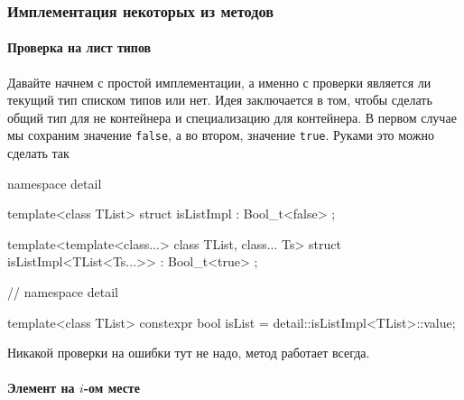 \subsubsection{Имплементация некоторых из методов}

\paragraph{Проверка на лист типов}

Давайте начнем с простой имплементации, а именно с проверки является ли текущий тип списком типов или нет.
Идея заключается в том, чтобы сделать общий тип для не контейнера и специализацию для контейнера.
В первом случае мы сохраним значение \verb"false", а во втором, значение \verb"true".
Руками это можно сделать так
\begin{cppcode}
namespace detail {

template<class TList>
struct isListImpl : Bool_t<false> {};

template<template<class...> class TList, class... Ts>
struct isListImpl<TList<Ts...>> : Bool_t<true> {};
} // namespace detail

template<class TList>
constexpr bool isList = detail::isListImpl<TList>::value;
\end{cppcode}
Никакой проверки на ошибки тут не надо, метод работает всегда.

\paragraph{Элемент на $i$-ом месте}

